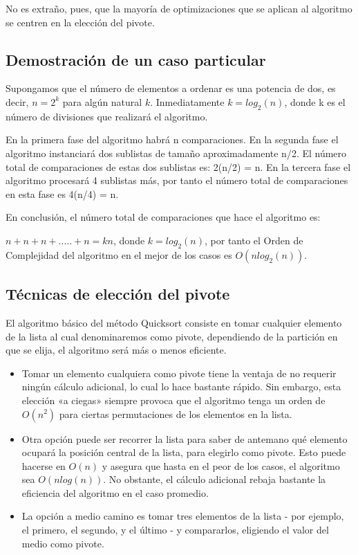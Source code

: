 \documentclass[8pt, A4]{article}    %
\begin{document}
No es extraño, pues, que la mayoría de optimizaciones que se aplican al algoritmo se centren en la elección del pivote.

\subsection{Demostración de un caso particular}
Supongamos que el número de elementos a ordenar es una potencia de dos, es decir, ${\displaystyle n=2^{k}}$ para algún natural ${\displaystyle k}$. Inmediatamente ${\displaystyle k=log_{2}(n)}$, donde k es el número de divisiones que realizará el algoritmo.

En la primera fase del algoritmo habrá n comparaciones. En la segunda fase el algoritmo instanciará dos sublistas de tamaño aproximadamente n/2. El número total de comparaciones de estas dos sublistas es: 2(n/2) = n. En la tercera fase el algoritmo procesará 4 sublistas más, por tanto el número total de comparaciones en esta fase es 4(n/4) = n.

En conclusión, el número total de comparaciones que hace el algoritmo es:

$ {\displaystyle n+n+n+.....+n=kn}$, donde ${\displaystyle k=log_{2}(n)}$, por tanto el Orden de Complejidad del algoritmo en el mejor de los casos es ${\displaystyle O(nlog_{2}(n))}$.

\subsection{Técnicas de elección del pivote}
El algoritmo básico del método Quicksort consiste en tomar cualquier elemento de la lista al cual denominaremos como pivote, dependiendo de la partición en que se elija, el algoritmo será más o menos eficiente.
\begin{itemize}
    \item Tomar un elemento cualquiera como pivote tiene la ventaja de no requerir ningún cálculo adicional, lo cual lo hace bastante rápido. Sin embargo, esta elección «a ciegas» siempre provoca que el algoritmo tenga un orden de $O(n^2)$ para ciertas permutaciones de los elementos en la lista.
    \item Otra opción puede ser recorrer la lista para saber de antemano qué elemento ocupará la posición central de la lista, para elegirlo como pivote. Esto puede hacerse en $O(n)$ y asegura que hasta en el peor de los casos, el algoritmo sea $O(n log(n))$. No obstante, el cálculo adicional rebaja bastante la eficiencia del algoritmo en el caso promedio.
    \item La opción a medio camino es tomar tres elementos de la lista - por ejemplo, el primero, el segundo, y el último - y compararlos, eligiendo el valor del medio como pivote.
\end{itemize}
\end{document}
